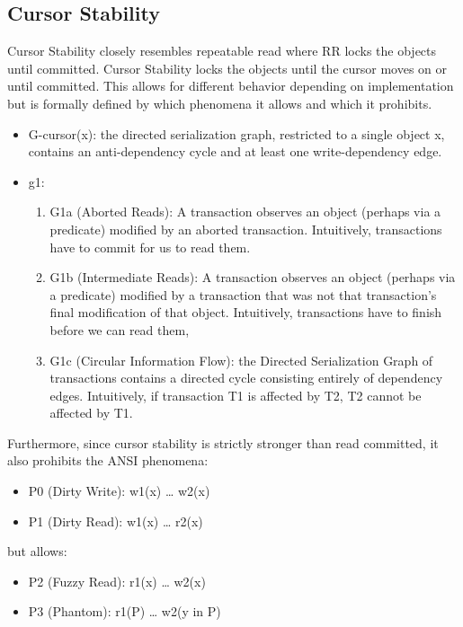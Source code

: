 \documentclass[a4paper,10pt,titlepage]{report}
\begin{document}
\subsection{Cursor Stability}
Cursor Stability closely resembles repeatable read where RR locks the objects until committed. Cursor Stability locks the objects until the cursor moves on or until committed. This allows for different behavior depending on implementation but is formally defined by which phenomena it allows and which it prohibits. \cite{Adya99weakconsistency}\\
\begin{itemize}
    \item G-cursor(x): the directed serialization graph, restricted to a single object x, contains an anti-dependency cycle and at least one write-dependency edge.
    \item g1:
    \begin{enumerate}
        \item G1a (Aborted Reads): A transaction observes an object (perhaps via a predicate) modified by an aborted transaction. Intuitively, transactions have to commit for us to read them.
        \item G1b (Intermediate Reads): A transaction observes an object (perhaps via a predicate) modified by a transaction that was not that transaction's final modification of that object. Intuitively, transactions have to finish before we can read them,
        \item G1c (Circular Information Flow): the Directed Serialization Graph of transactions contains a directed cycle consisting entirely of dependency edges. Intuitively, if transaction T1 is affected by T2, T2 cannot be affected by T1.
    \end{enumerate}
\end{itemize}
Furthermore, since cursor stability is strictly stronger than read committed, it also prohibits the ANSI phenomena:
\begin{itemize}
    \item P0 (Dirty Write): w1(x) … w2(x)
    \item P1 (Dirty Read): w1(x) … r2(x)
\end{itemize}

but allows:
\begin{itemize}
    \item P2 (Fuzzy Read): r1(x) … w2(x)
    \item P3 (Phantom): r1(P) … w2(y in P)
\end{itemize}
\end{document}
